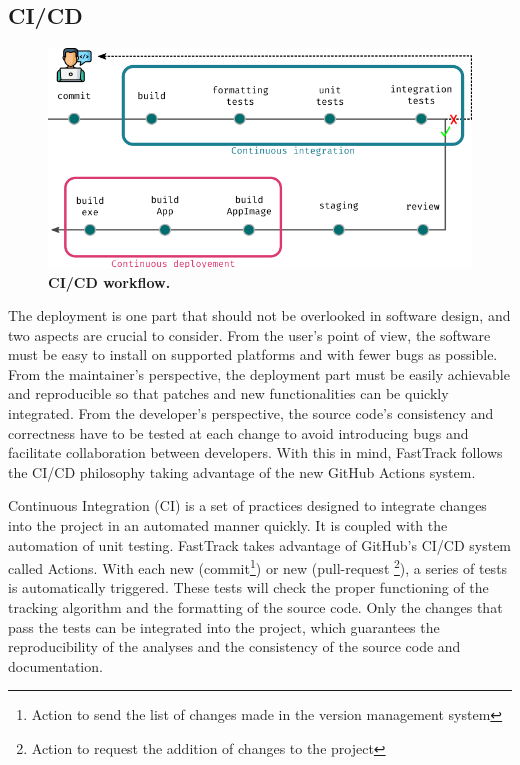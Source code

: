 		\subsection{CI/CD}
        \begin{figure}[h]
        \centering
        \includegraphics[width=1\textwidth]{part_1/assets/Figure_cicd.png}
        \caption{\textbf{CI/CD workflow.}}
        \label{part_1:fig_cicd}
        \end{figure}
        The deployment is one part that should not be overlooked in software design, and two aspects are crucial to consider. From the user's point of view, the software must be easy to install on supported platforms and with fewer bugs as possible. From the maintainer's perspective, the deployment part must be easily achievable and reproducible so that patches and new functionalities can be quickly integrated. From the developer's perspective, the source code's consistency and correctness have to be tested at each change to avoid introducing bugs and facilitate collaboration between developers.  With this in mind, FastTrack follows the CI/CD philosophy \cite{shahin2017continuous}\cite{wikstrom2019benefits} taking advantage of the new GitHub Actions system.

        Continuous Integration (CI) is a set of practices designed to integrate changes into the project in an automated manner quickly. It is coupled with the automation of unit testing. FastTrack takes advantage of GitHub's CI/CD system called Actions. With each new (commit\footnote{Action to send the list of changes made in the version management system}) or new (pull-request \footnote{Action to request the addition of changes to the project}), a series of tests is automatically triggered. These tests will check the proper functioning of the tracking algorithm and the formatting of the source code. Only the changes that pass the tests can be integrated into the project, which guarantees the reproducibility of the analyses and the consistency of the source code and documentation.

